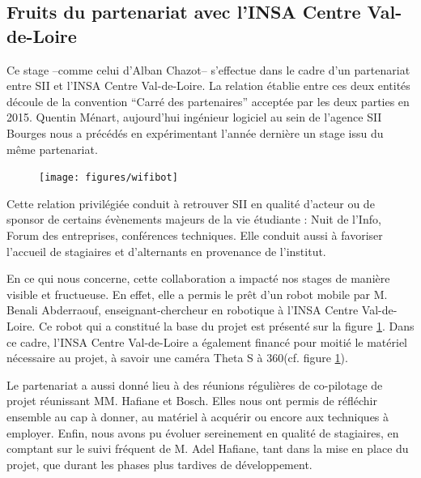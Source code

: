 \subsection{Fruits du partenariat avec l'INSA Centre Val-de-Loire}

Ce stage --comme celui d'Alban Chazot-- s'effectue dans le cadre d'un partenariat entre SII et l'INSA Centre Val-de-Loire. 
La relation établie entre ces deux entités découle de la convention ``Carré des partenaires'' acceptée par les deux parties en 2015.
Quentin Ménart, aujourd'hui ingénieur logiciel au sein de l'agence SII Bourges nous a précédés en expérimentant l'année dernière un stage issu du même partenariat.  

\begin{figure}[h]
    \centering
    \texttt{[image: figures/wifibot]}
    \label{fig:Wifibot}
\end{figure}


Cette relation privilégiée conduit à retrouver SII en qualité d'acteur ou de sponsor de certains évènements majeurs de la vie étudiante : Nuit de l'Info, Forum des entreprises, conférences techniques.
Elle conduit aussi à favoriser l'accueil de stagiaires et d'alternants en provenance de l'institut.  

En ce qui nous concerne, cette collaboration a impacté nos stages de manière visible et fructueuse.
En effet, elle a permis le prêt d'un robot mobile par M. Benali Abderraouf, enseignant-chercheur en robotique à l'INSA Centre Val-de-Loire. 
Ce robot qui a constitué la base du projet est présenté sur la figure \ref{fig:Wifibot}.
Dans ce cadre, l'INSA Centre Val-de-Loire a également financé pour moitié le matériel nécessaire au projet, à savoir une caméra Theta S à 360\degre (cf. figure \ref{fig:Wifibot}).

Le partenariat a aussi donné lieu à des réunions régulières de co-pilotage de projet réunissant MM. Hafiane et Bosch. 
Elles nous ont permis de réfléchir ensemble au cap à donner, au matériel à acquérir ou encore aux techniques à employer.
Enfin, nous avons pu évoluer sereinement en qualité de stagiaires, en comptant sur le suivi fréquent de M. Adel Hafiane, tant dans la mise en place du projet, que durant les phases plus tardives de développement.
